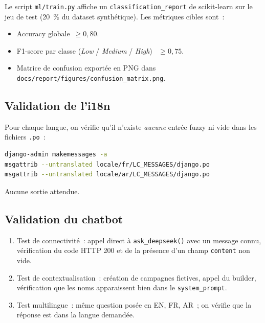 Le script \texttt{ml/train.py} affiche un \texttt{classification\_report}
de scikit-learn sur le jeu de test (20~\% du dataset synthétique). Les
métriques cibles sont~:

\begin{itemize}
    \item Accuracy globale~$\geq 0{,}80$.
    \item F1-score par classe (\emph{Low} / \emph{Medium} / \emph{High})~%
    $\geq 0{,}75$.
    \item Matrice de confusion exportée en PNG dans
    \texttt{docs/report/figures/confusion\_matrix.png}.
\end{itemize}

\subsection{Validation de l'i18n}

Pour chaque langue, on vérifie qu'il n'existe \emph{aucune} entrée fuzzy
ni vide dans les fichiers \texttt{.po}~:

\begin{lstlisting}[language=bash]
django-admin makemessages -a
msgattrib --untranslated locale/fr/LC_MESSAGES/django.po
msgattrib --untranslated locale/ar/LC_MESSAGES/django.po
\end{lstlisting}

Aucune sortie attendue.

\subsection{Validation du chatbot}

\begin{enumerate}
    \item Test de connectivité~: appel direct à \texttt{ask\_deepseek()}
    avec un message connu, vérification du code HTTP 200 et de la présence
    d'un champ \texttt{content} non vide.
    \item Test de contextualisation~: création de campagnes fictives,
    appel du builder, vérification que les noms apparaissent bien dans le
    \texttt{system\_prompt}.
    \item Test multilingue~: même question posée en EN, FR, AR~; on vérifie
    que la réponse est dans la langue demandée.
\end{enumerate}
